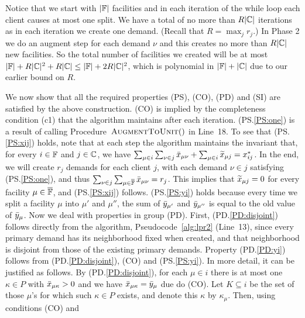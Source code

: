 \documentclass[11pt]{article}
\begin{document}


Notice that we start with $|\mathbb{F}|$ facilities and in each
iteration of the while loop each client causes at most one split.  We
have a total of no more than $R|\mathbb{C}|$ iterations as in each
iteration we create one demand. (Recall that $R = \max_jr_j$.) In
Phase 2 we do an augment step for each demand $\nu$ and this creates
no more than $R|\mathbb{C}|$ new facilities.  So the total number of
facilities we created will be at most $|\mathbb{F}|+ R|\mathbb{C}|^2 +
R|\mathbb{C}| \leq |\mathbb{F}| + 2R|\mathbb{C}|^2$, which is
polynomial in $|\mathbb{F}|+|\mathbb{C}|$ due to our earlier bound on
$R$.


\medskip

  We now show that all the required
properties (PS), (CO), (PD) and (SI) are satisfied by the above
construction. (CO) is implied by the completeness condition (c1) that
the algorithm maintains after each iteration. (PS.\ref{PS:one}) is a
result of calling Procedure~${\textsc{AugmentToUnit}}()$ in Line~18. To see that
(PS.\ref{PS:xij}) holds, note that at each step the algorithm
maintains the invariant that, for every $i\in\mathbb{F}$ and
$j\in\mathbb{C}$, we have $\sum_{\mu\in i}\sum_{\nu \in j} {\bar x}_{\mu
  \nu} + \sum_{\mu\in i} {\widetilde x}_{\mu j} = x_{ij}^\ast$. In the end,
we will create $r_j$ demands for each client $j$, with each demand
$\nu\in j$ satisfying (PS.\ref{PS:one}), and thus $\sum_{\nu\in
  j}\sum_{\mu\in\overline{\mathbb{F}}}{\bar x}_{\mu\nu}=r_j$.  This implies that
${\widetilde x}_{\mu j}=0$ for every facility $\mu\in\overline{\mathbb{F}}$, and
(PS.\ref{PS:xij}) follows.  (PS.\ref{PS:yi}) holds because every time
we split a facility $\mu$ into $\mu'$ and $\mu''$, the sum of
${\bar y}_{\mu'}$ and ${\bar y}_{\mu''}$ is equal to the old value of
${\bar y}_{\mu}$. Now we deal with properties in group (PD).  First,
(PD.\ref{PD:disjoint}) follows directly from the algorithm,
Pseudocode~\ref{alg:lpr2} (Line~13), since every primary demand has
its neighborhood fixed when created, and that neighborhood is disjoint
from those of the existing primary demands. Property (PD.\ref{PD:yi})
follows from (PD.\ref{PD:disjoint}), (CO) and (PS.\ref{PS:yi}). In
more detail, it can be justified as follows. By
(PD.\ref{PD:disjoint}), for each $\mu\in i$ there is at most one
$\kappa\in P$ with ${\bar x}_{\mu\kappa} > 0$ and we have
${\bar x}_{\mu\kappa} = {\bar y}_{\mu}$ due do (CO).  Let $K\subseteq i$ be
the set of those $\mu$'s for which such $\kappa\in P$ exists, and
denote this $\kappa$ by $\kappa_\mu$. Then, using conditions (CO) and
\end{document}
